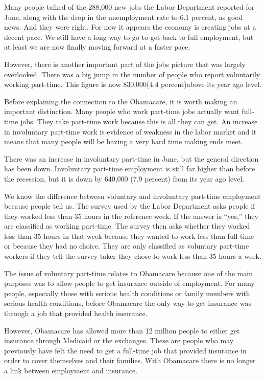 Many people talked of the 288,000 new jobs the Labor Department reported for June, along with the drop in the unemployment rate to 6.1 percent, as good news. And they were right. For now it appears the economy is creating jobs at a decent pace. We still have a long way to go to get back to full employment, but at least we are now finally moving forward at a faster pace.


However, there is another important part of the jobs picture that was largely overlooked. There was a big jump in the number of people who report voluntarily working part-time. This figure is now 830,000(4.4 percent)above its year ago level.


Before explaining the connection to the Obamacare, it is worth making an important distinction. Many people who work part-time jobs actually want full-time jobs. They take part-time work because this is all they can get. An increase in involuntary part-time work is evidence of weakness in the labor market and it means that many people will be having a very hard time making ends meet.


There was an increase in involuntary part-time in June, but the general direction has been down. Involuntary part-time employment is still far higher than before the recession, but it is down by 640,000 (7.9 percent) from its year ago level.


We know the difference between voluntary and involuntary part-time employment because people tell us. The survey used by the Labor Department asks people if they worked less than 35 hours in the reference week. If the answer is ``yes,'' they are classified as working part-time. The survey then asks whether they worked less than 35 hours in that week because they wanted to work less than full time or because they had no choice. They are only classified as voluntary part-time workers if they tell the survey taker they chose to work less than 35 hours a week.


The issue of voluntary part-time relates to Obamacare because one of the main purposes was to allow people to get insurance outside of employment. For many people, especially those with serious health conditions or family members with serious health conditions, before Obamacare the only way to get insurance was through a job that provided health insurance.


However, Obamacare has allowed more than 12 million people to either get insurance through Medicaid or the exchanges. These are people who may previously have felt the need to get a full-time job that provided insurance in order to cover themselves and their families. With Obamacare there is no longer a link between employment and insurance.